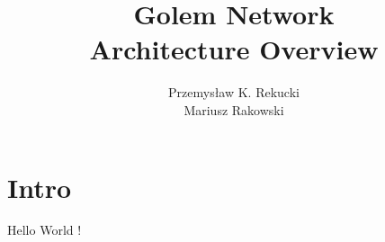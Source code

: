 \documentclass[12pt]{article}
\author{Przemysław K. Rekucki \\ Mariusz Rakowski}
\title{Golem Network \\ Architecture Overview}
\begin{document}
\maketitle{}

\section{Intro}

Hello World !
\end{document}
